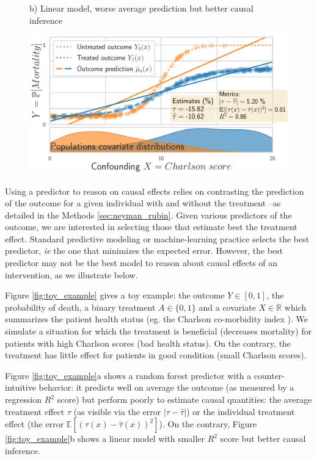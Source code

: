 \documentclass[10pt]{article}
\begin{document}
\begin{multicols}{2}
\begin{figure}[b!]
\begin{minipage}{.577\linewidth}
            {\sffamily\small b) Linear model, worse average prediction but better causal inference}

            \hfill%
            \includegraphics[width=1\linewidth]{images/toy_tlinear_model_small_R2_small_tau_risk.pdf}%
        \end{minipage}%
    \end{figure}

    Using a predictor to reason on causal effects relies on contrasting the
    prediction of the outcome for a given individual with and without the
    treatment --as detailed in the Methods \autoref{sec:neyman_rubin}.
    Given various predictors of the outcome, we are interested in
    selecting those that estimate best the treatment effect.
    Standard predictive modeling or machine-learning practice selects the
    best predictor, \emph{ie} the one that minimizes the expected error.
    However, the best predictor may not be the best model to reason about
    causal effects of an intervention, as we illustrate below.

    Figure \ref{fig:toy_example} gives a toy example: the
    outcome $Y \in [0, 1]$, the
    probability of death, a binary treatment $A \in \{0, 1\}$ and a covariate
    $X \in \mathbb R$ which summarizes the patient health status (eg. the
    Charlson co-morbidity index \cite{charlson_new_1987}). We simulate a
    situation for which the treatment is beneficial (decreases
    mortality) for patients with high Charlson scores (bad health
    status). On the contrary, the treatment has little effect for patients in good
    condition (small Charlson scores).


    Figure \ref{fig:toy_example}a shows a random forest predictor with a
    counter-intuitive behavior: it predicts well on average the outcome (as
    measured by a regression $R^2$ score) but perform poorly to estimate
    causal quantities: the average treatment effect $\tau$ (as visible via
    the error $|\tau - \hat{\tau}|$) or the individual treatment
    effect (the error $\mathbb{E}[(\tau(x) - \hat{\tau}(x))^2]$).
    On the contrary, Figure \ref{fig:toy_example}b shows a linear model with
    smaller $R^2$ score but better causal inference.%


\end{multicols}
\end{document}
